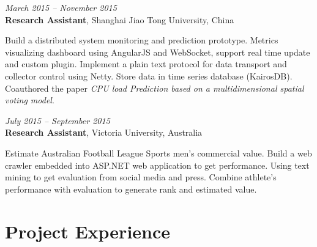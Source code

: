 \documentclass[fontsize=10pt]{tccv}
\begin{document}
\begin{eventlist}


\textit{March 2015 -- November 2015} \\
\textbf{Research Assistant}, Shanghai Jiao Tong University, China\smallskip

Build a distributed system monitoring and prediction prototype.
Metrics visualizing dashboard using AngularJS and WebSocket, support real time update and custom plugin.
Implement a plain text protocol for data transport and collector control using Netty.
Store data in time series database (KairosDB).
Coauthored the paper \textit{CPU load Prediction based on a multidimensional spatial voting model}.

\medskip


\textit{July 2015 -- September 2015} \\
\textbf{Research Assistant}, Victoria University, Australia\smallskip

Estimate Australian Football League Sports men's commercial value.
Build a web crawler embedded into ASP.NET web application to get performance.
Using text mining to get evaluation from social media and press.
Combine athlete's performance with evaluation to generate rank and estimated value.

\end{eventlist}

\section{Project Experience}
\end{document}

